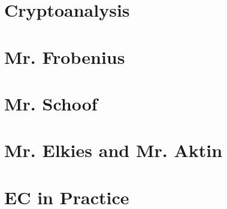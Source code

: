 \documentclass[tikz]{scrreprt}
\begin{document}
\section{Cryptoanalysis} 
\section{Mr. Frobenius} 
\section{Mr. Schoof} 
\section{Mr. Elkies and Mr. Aktin} 
\section{EC in Practice} 
\end{document}
